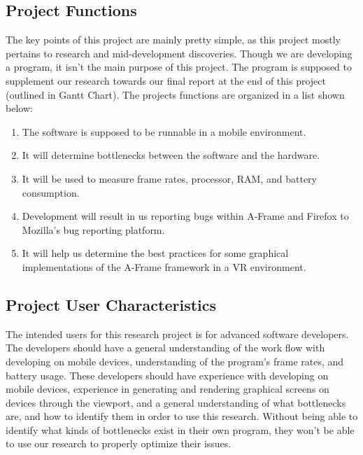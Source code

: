 \documentclass[letterpaper,10pt,titlepage,draftclsnofoot,onecolumn,compsoc,utf8,latin1]{IEEEtran}
\begin{document}
\subsection{Project Functions}
\begin{singlespace}
\noindent
The key points of this project are mainly pretty simple, as this project mostly pertains to research and mid-development discoveries. Though we are developing a program, it isn't the main purpose of this project. The program is supposed to supplement our research towards our final report at the end of this project (outlined in Gantt Chart). The projects functions are organized in a list shown below:\\
\begin{enumerate}[labelsep=2em,leftmargin=.5in]
    \item The software is supposed to be runnable in a mobile environment. 
    \item It will determine bottlenecks between the software and the hardware.
    \item It will be used to measure frame rates, processor, RAM, and battery consumption.
    \item Development will result in us reporting bugs within A-Frame and Firefox to Mozilla's bug reporting platform.
    \item It will help us determine the best practices for some graphical implementations of the A-Frame framework in a VR environment.
\end{enumerate}
\end{singlespace}

\subsection{Project User Characteristics}
\begin{singlespace}
\noindent
The intended users for this research project is for advanced software developers. The developers should have a general understanding of the work flow with developing on mobile devices, understanding of the program's frame rates, and battery usage. These developers should have experience with developing on mobile devices, experience in generating and rendering graphical screens on devices through the viewport, and a general understanding of what bottlenecks are, and how to identify them in order to use this research. Without being able to identify what kinds of bottlenecks exist in their own program, they won't be able to use our research to properly optimize their issues.
\end{singlespace}
\end{document}
